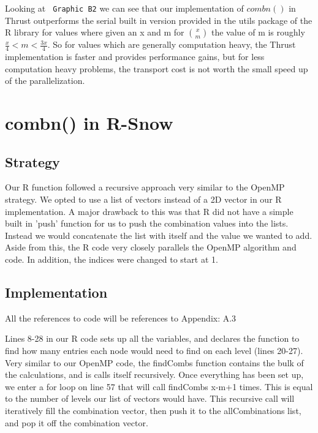 \documentclass[titlepage, 11pt]{article}
\begin{document}
Looking at \verb; Graphic B2; we can see that our implementation of $combn()$ in Thrust outperforms the serial built in version provided in the utils package of the R library for values where given an x and m for ${x \choose m}$ the value of m is roughly $\frac{x}{4} < m < \frac{3x}{4}$. So for values which are generally computation heavy, the Thrust implementation is faster and provides performance gains, but for less computation heavy problems, the transport cost is not worth the small speed up of the parallelization.

\section{combn() in R-Snow}

\subsection{Strategy}
Our R function followed a recursive approach very similar to the OpenMP strategy. We opted to use a list of vectors instead of a 2D vector in our R implementation. A major drawback to this was that R did not have a simple built in 'push' function for us to push the combination values into the lists. Instead we would concatenate the list with itself and the value we wanted to add. Aside from this, the R code very closely parallels the OpenMP algorithm and code. In addition, the indices were changed to start at 1.

\subsection{Implementation}
\begin{center}\textcolor{black!50}{All the references to code will be references to Appendix: A.3}\\ \end{center}


Lines 8-28 in our R code sets up all the variables, and declares the function to find how many entries each node would need to find on each level (lines 20-27). Very similar to our OpenMP code, the findCombs function contains the bulk of the calculations, and is calls itself recursively. Once everything has been set up, we enter a for loop on line 57 that will call findCombs x-m+1 times. This is equal to the number of levels our list of vectors would have. This recursive call will iteratively fill the combination vector, then push it to the allCombinations list, and pop it off the combination vector.
\end{document}
